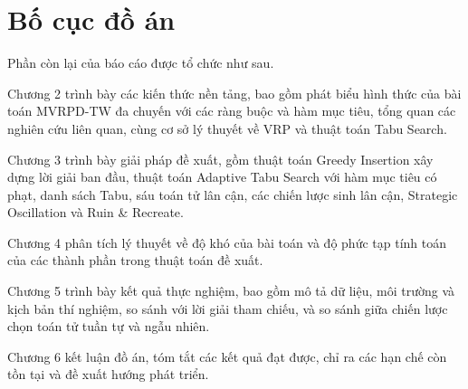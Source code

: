 \documentclass[../DoAn.tex]{subfiles}
\begin{document}
\section{Bố cục đồ án}

Phần còn lại của báo cáo được tổ chức như sau.

Chương 2 trình bày các kiến thức nền tảng, bao gồm phát biểu hình thức của bài toán MVRPD-TW đa chuyến với các ràng buộc và hàm mục tiêu, tổng quan các nghiên cứu liên quan, cùng cơ sở lý thuyết về VRP và thuật toán Tabu Search.

Chương 3 trình bày giải pháp đề xuất, gồm thuật toán Greedy Insertion xây dựng lời giải ban đầu, thuật toán Adaptive Tabu Search với hàm mục tiêu có phạt, danh sách Tabu, sáu toán tử lân cận, các chiến lược sinh lân cận, Strategic Oscillation và Ruin \& Recreate.

Chương 4 phân tích lý thuyết về độ khó của bài toán và độ phức tạp tính toán của các thành phần trong thuật toán đề xuất.

Chương 5 trình bày kết quả thực nghiệm, bao gồm mô tả dữ liệu, môi trường và kịch bản thí nghiệm, so sánh với lời giải tham chiếu, và so sánh giữa chiến lược chọn toán tử tuần tự và ngẫu nhiên.

Chương 6 kết luận đồ án, tóm tắt các kết quả đạt được, chỉ ra các hạn chế còn tồn tại và đề xuất hướng phát triển.
\end{document}
